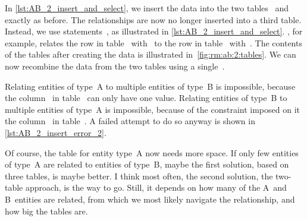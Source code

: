 In \cref{lst:AB_2_insert_and_select}, we insert the data into the two tables~ and~ exactly as before.
The relationships are now no longer inserted into a third table.
Instead, we use  statements~\cite{PGDG:PD:U}, as illustrated in \cref{lst:AB_2_insert_and_select}.
, for example, relates the row in table~ with~ to the row in table~ with~.
The contents of the tables after creating the data is illustrated in~\cref{fig:rm:ab:2:tables}.
We can now recombine the data from the two tables using a single~.

Relating entities of type~A to multiple entities of type~B is impossible, because the column~ in table~ can only have one value.
Relating entities of type~B to multiple entities of type~A is impossible, because of the  constraint imposed on it the column~ in table~.
A failed attempt to do so anyway is shown in \cref{lst:AB_2_insert_error_2}.

Of course, the table for entity type~A now needs more space.
If only few entities of type~A are related to entities of type~B, maybe the first solution, based on three tables, is maybe better.
I think most often, the second solution, the two-table approach, is the way to go.
Still, it depends on how many of the A~and B~entities are related, from which  we most likely navigate the relationship, and how big the tables are.%
%
\FloatBarrier%
\endhsection%
